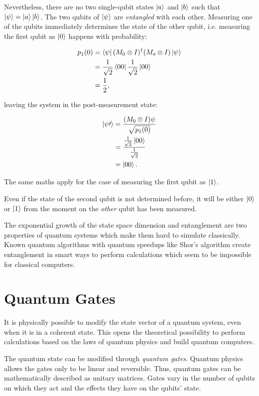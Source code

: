 Nevertheless, there are no two single-qubit states $\Ket{a}$
and $\Ket{b}$ such that $\Ket{\psi} = \Ket{a} \Ket{b}$. The two qubits of
$\Ket{\psi}$ are \textit{entangled} with each other. Measuring one of the qubits
immediately determines the state of the other qubit, i.e. measuring the first
qubit as $\Ket{0}$ happens with probability:

\begin{align}
  p_1(0) &= \Bra{\psi} (M_0 \otimes I)^{\dagger} (M_o \otimes I) \Ket{\psi} \\
         &= \frac{1}{\sqrt{2}} \Bra{00} \frac{1}{\sqrt{2}} \Ket{00} \\
         &= \frac{1}{2},
\end{align}

leaving the system in the post-measurement state:

\begin{align}
  \Ket{\psi\prime} &= \frac{(M_0 \otimes I) \psi}{\sqrt{p_1(0)}} \\
                   &= \frac{\frac{1}{\sqrt{2}} \Ket{00}}{\frac{1}{\sqrt{2}}} \\
                   &= \Ket{00}.
\end{align}

The same maths apply for the case of measuring the first qubit as $\Ket{1}$.

Even if the state of the second qubit is not determined before, it will be
either $\Ket{0}$ or $\Ket{1}$ from the moment on the \textit{other} qubit has been measured.

The exponential growth of the state space dimension and entanglement are two 
properties of quantum systems which make them hard to simulate
classically.
Known quantum algorithms with quantum speedups like Shor's algorithm
create entanglement in smart ways to perform calculations which seem
to be impossible for classical computers.

\section{Quantum Gates}
\label{sec:quantum_gates}

It is physically possible to modify the state vector of a quantum system, even
when it is in a coherent state. This opens the theoretical possibility to perform
calculations based on the laws of quantum physics and build quantum computers.

The quantum state can be modified through \textit{quantum gates}. 
Quantum physics allows the gates only to be linear and reversible. Thus,
quantum gates can be mathematically described as unitary matrices. Gates vary in the number of
qubits on which they act and the effects they have on the qubits' state.

